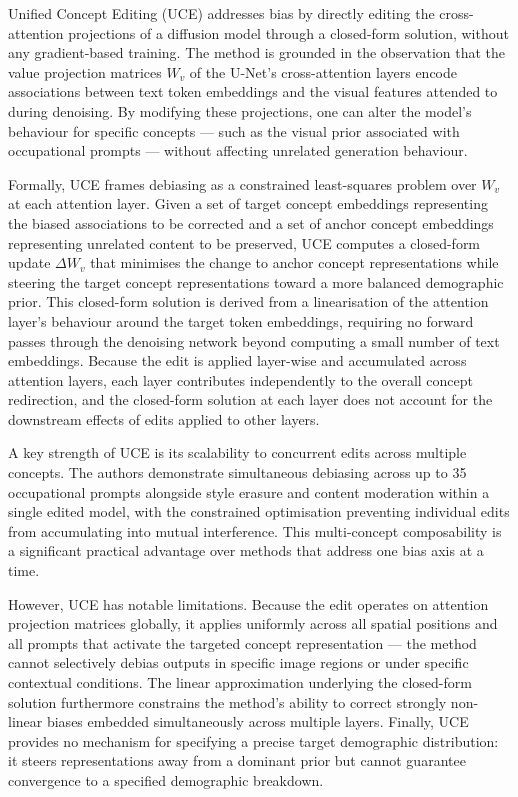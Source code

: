 Unified Concept Editing (UCE) \cite{Gandikota_2024_UCE} addresses 
bias by directly editing the cross-attention projections of a 
diffusion model through a closed-form solution, without any 
gradient-based training. The method is grounded in the observation 
that the value projection matrices $W_v$ of the U-Net's 
cross-attention layers encode associations between text token 
embeddings and the visual features attended to during denoising. 
By modifying these projections, one can alter the model's behaviour 
for specific concepts — such as the visual prior associated with 
occupational prompts — without affecting unrelated generation 
behaviour.

Formally, UCE frames debiasing as a constrained least-squares 
problem over $W_v$ at each attention layer. Given a set of target 
concept embeddings representing the biased associations to be 
corrected and a set of anchor concept embeddings representing 
unrelated content to be preserved, UCE computes a closed-form 
update $\Delta W_v$ that minimises the change to anchor concept 
representations while steering the target concept representations 
toward a more balanced demographic prior. This closed-form solution 
is derived from a linearisation of the attention layer's behaviour 
around the target token embeddings, requiring no forward passes 
through the denoising network beyond computing a small number of 
text embeddings. Because the edit is applied layer-wise and 
accumulated across attention layers, each layer contributes 
independently to the overall concept redirection, and the 
closed-form solution at each layer does not account for the 
downstream effects of edits applied to other layers.

A key strength of UCE is its scalability to concurrent edits across 
multiple concepts. The authors demonstrate simultaneous debiasing 
across up to 35 occupational prompts alongside style erasure and 
content moderation within a single edited model, with the 
constrained optimisation preventing individual edits from 
accumulating into mutual interference. This multi-concept 
composability is a significant practical advantage over methods 
that address one bias axis at a time.

However, UCE has notable limitations. Because the edit operates on 
attention projection matrices globally, it applies uniformly across 
all spatial positions and all prompts that activate the targeted 
concept representation — the method cannot selectively debias 
outputs in specific image regions or under specific contextual 
conditions. The linear approximation underlying the closed-form 
solution furthermore constrains the method's ability to correct 
strongly non-linear biases embedded simultaneously across multiple 
layers. Finally, UCE provides no mechanism for specifying a precise 
target demographic distribution: it steers representations away from 
a dominant prior but cannot guarantee convergence to a specified 
demographic breakdown.

